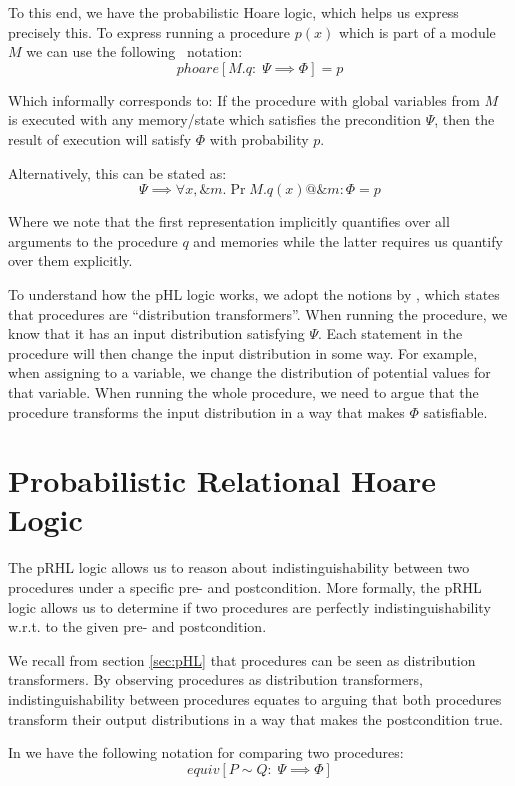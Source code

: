 To this end, we have the probabilistic Hoare logic, which helps us express precisely this.
To express running a procedure $p(x)$ which is part of a module $M$ we can use the
following \easycrypt\ notation:
\[
  phoare[M.q :\; \Psi \implies \Phi] = p
\]

Which informally corresponds to: If the procedure with global variables from $M$
is executed with any memory/state which satisfies the precondition $\Psi$, then the
result of execution will satisfy $\Phi$ with probability $p$.

Alternatively, this can be stated as:
\begin{equation}
  \label{eq:proc_pr}
  \Psi \implies \forall x, \&m.\Pr{M.q(x) @ \&m : \Phi} = p
\end{equation}

Where we note that the first representation implicitly quantifies over all
arguments to the procedure $q$ and memories while the latter requires us
quantify over them explicitly.

To understand how the pHL logic works, we adopt the notions by \citet{ec_intro},
which states that procedures are ``distribution transformers''.
When running the procedure, we know that it has an input distribution satisfying
$\Psi$. Each statement in the procedure will then change the input distribution
in some way. For example, when assigning to a variable, we change the
distribution of potential values for that variable. When running the whole
procedure, we need to argue that the procedure transforms the input distribution
in a way that makes $\Phi$ satisfiable.

\section{Probabilistic Relational Hoare Logic}
\label{sec:pRHL}
The pRHL logic allows us to reason about indistinguishability between two
procedures under a specific pre- and postcondition. More formally, the pRHL logic
allows us to determine if two procedures are perfectly indistinguishability w.r.t.
to the given pre- and postcondition.

We recall from section \ref{sec:pHL} that procedures can be seen as distribution
transformers. By observing procedures as distribution transformers,
indistinguishability between procedures equates to arguing that both procedures
transform their output distributions in a way that makes the postcondition
true.

In \easycrypt we have the following notation for comparing two procedures:
\[
  equiv[P \sim Q :\; \Psi \implies \Phi ]
\]

